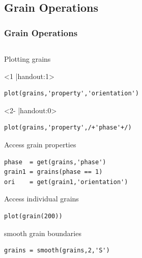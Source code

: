 \subsection*{Grain Operations}


\begin{frame}[fragile]
  \frametitle{Grain Operations}

  \begin{columns}
    \begin{column}{8.5cm}

      Plotting grains
      \begin{onlyenv}<1 |handout:1>
\begin{lstlisting}
plot(grains,'property','orientation')
\end{lstlisting}
      \end{onlyenv}

      \begin{onlyenv}<2- |handout:0>
\begin{lstlisting}
plot(grains,'property',/+'phase'+/)
\end{lstlisting}
      \end{onlyenv}

      \pause
      \pause

\bigskip

      Access grain properties
\begin{lstlisting}
phase  = get(grains,'phase')
grain1 = grains(phase == 1)
ori    = get(grain1,'orientation')
\end{lstlisting}

\pause

\bigskip

Access individual grains
\begin{lstlisting}
plot(grain(200))
\end{lstlisting}

\pause
\bigskip

smooth grain boundaries
\begin{lstlisting}
grains = smooth(grains,2,'S')
\end{lstlisting}





\end{column}
\end{columns}
\end{frame}
